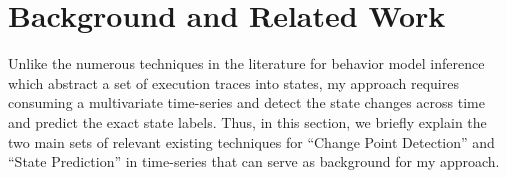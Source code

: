 \chapter{Background and Related Work} \label{sec:background}
Unlike the numerous techniques in the literature for behavior model inference \cite{lang1998results, walkinshaw2016inferring, Lo2007Mining, dallmeier2006mining} which abstract a set of execution traces into states, my approach requires consuming a multivariate time-series and detect the state changes across time and predict the exact state labels. Thus, in this section, we briefly explain the two main sets of relevant existing techniques for ``Change Point Detection'' and ``State Prediction'' in time-series that can serve as background for my approach.  


